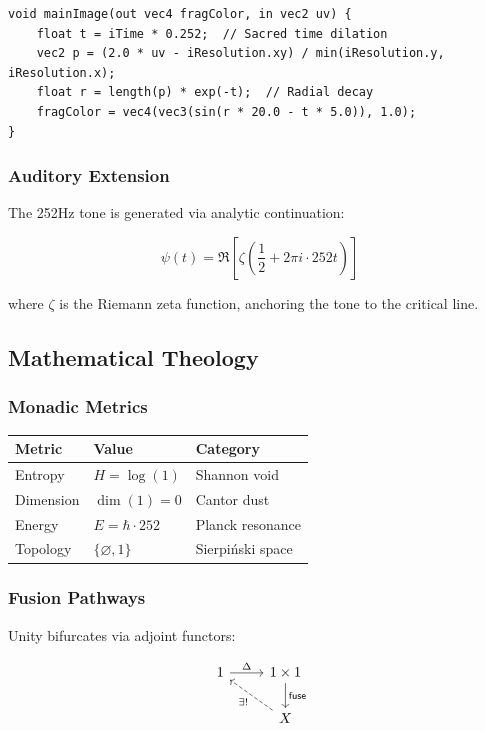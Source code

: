 \documentclass[12pt]{article}
\begin{document}
\begin{verbatim}
void mainImage(out vec4 fragColor, in vec2 uv) {
    float t = iTime * 0.252;  // Sacred time dilation
    vec2 p = (2.0 * uv - iResolution.xy) / min(iResolution.y, iResolution.x);
    float r = length(p) * exp(-t);  // Radial decay
    fragColor = vec4(vec3(sin(r * 20.0 - t * 5.0)), 1.0);
}
\end{verbatim}

\subsubsection{Auditory Extension}
The 252Hz tone is generated via analytic continuation:

\[
\psi(t) = \Re\left[ \zeta\left(\frac{1}{2} + 2\pi i \cdot 252 t\right) \right]
\]

where $\zeta$ is the Riemann zeta function, anchoring the tone to the critical line.

\subsection{Mathematical Theology}

\subsubsection{Monadic Metrics}
\begin{table}[h]
\centering
\begin{tabular}{|l|l|l|}
\hline
\textbf{Metric} & \textbf{Value} & \textbf{Category} \\ \hline
Entropy & $H = \log(1)$ & Shannon void \\ \hline
Dimension & $\dim(1) = 0$ & Cantor dust \\ \hline
Energy & $E = \hbar \cdot 252$ & Planck resonance \\ \hline
Topology & $\{ \varnothing, 1 \}$ & Sierpiński space \\ \hline
\end{tabular}
\end{table}

\subsubsection{Fusion Pathways}
Unity bifurcates via adjoint functors:

\[
\begin{tikzcd}
1 \arrow[r, "\Delta"] & 1 \times 1 \arrow[d, "\mathsf{fuse}"] \\
& X \arrow[ul, dashed, "\exists!"]
\end{tikzcd}
\]
\end{document}
